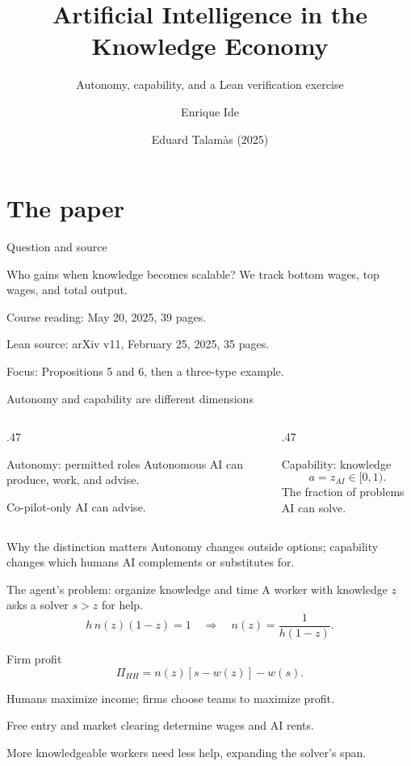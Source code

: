 \documentclass[aspectratio=169,12pt]{beamer}
\title{Artificial Intelligence in the Knowledge Economy}
\subtitle{Autonomy, capability, and a Lean verification exercise}
\author{Enrique Ide \and Eduard Talam\`as (2025)}
\institute{\href{https://github.com/gsaco/ai-05-ide}{github.com/gsaco/ai-05-ide}}
\date{}
\begin{document}
\begin{frame}[plain]\titlepage\end{frame}

\section{The paper}
\begin{frame}{Question and source}
\begin{block}{Who gains when knowledge becomes scalable?}
We track bottom wages, top wages, and total output.
\end{block}
\vspace{4mm}
\begin{points}
\item Course reading: May 20, 2025, 39 pages.
\item Lean source: arXiv v11, February 25, 2025, 35 pages.
\item Focus: Propositions 5 and 6, then a three-type example.
\end{points}
\end{frame}

\begin{frame}{Autonomy and capability are different dimensions}
\begin{columns}[T,onlytextwidth]
\begin{column}{.47\textwidth}
\begin{block}{Autonomy: permitted roles}
Autonomous AI can produce, work, and advise.\par\medskip
Co-pilot-only AI can advise.
\end{block}
\end{column}
\begin{column}{.47\textwidth}
\begin{block}{Capability: knowledge}
\[a=z_{AI}\in[0,1).\]
The fraction of problems AI can solve.
\end{block}
\end{column}
\end{columns}
\vspace{5mm}
\begin{block}{Why the distinction matters}
Autonomy changes outside options; capability changes which humans AI complements or substitutes for.
\end{block}
\end{frame}

\begin{frame}{The agent's problem: organize knowledge and time}
A worker with knowledge $z$ asks a solver $s>z$ for help.
\[h\,n(z)(1-z)=1
\quad\Longrightarrow\quad n(z)=\frac{1}{h(1-z)}.\]
\begin{block}{Firm profit}
\[\Pi_{HH}=n(z)[s-w(z)]-w(s).\]
\end{block}
Humans maximize income; firms choose teams to maximize profit.\par\medskip
Free entry and market clearing determine wages and AI rents.\par\medskip
More knowledgeable workers need less help, expanding the solver's span.
\end{frame}
\end{document}
